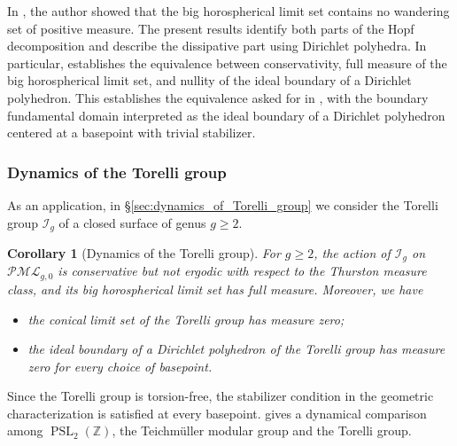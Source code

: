 \documentclass[dvipdfmx]{amsart}
\newtheorem{corollary}{Corollary}[section]
\theoremstyle{remark}
\newcommand{\torelliG}{\mathcal{I}}
\newcommand{\pml}{\mathcal{PML}}
\begin{document}
In \cite[Proposition~8.2]{miyachi2025functiontheorydynamicsergodic},
the author showed that the big horospherical limit set contains
no wandering set of positive measure.
The present results identify both parts of the Hopf decomposition
and describe the dissipative part using Dirichlet polyhedra.
In particular,  establishes the equivalence between conservativity, full measure of
the big horospherical limit set, and nullity of the ideal boundary
of a Dirichlet polyhedron. This establishes the equivalence asked for in \cite[Problem~9]{miyachi2025functiontheorydynamicsergodic},
with the boundary fundamental domain interpreted as the ideal boundary of a Dirichlet polyhedron centered at a basepoint with trivial stabilizer.

\subsubsection{Dynamics of the Torelli group}
As an application, in \S\ref{sec:dynamics_of_Torelli_group} we consider the Torelli group $\torelliG_g$ of a closed surface of genus $g\ge 2$.

\begin{corollary}[Dynamics of the Torelli group]
\label{coro:torelli_main}
For $g\ge 2$, the action of $\torelliG_g$ on $\pml_{g,0}$ is
conservative but not ergodic with respect to the Thurston measure class, and its big horospherical limit set has full measure.
Moreover, we have
\begin{itemize}
\item[(a)] the conical limit set of the Torelli group has measure zero;
\item[(b)] the ideal boundary of a Dirichlet polyhedron of the Torelli group has measure zero for every choice of basepoint.
\end{itemize}
\end{corollary}

Since the Torelli group is torsion-free, the stabilizer condition in the geometric characterization is satisfied at every basepoint.
 gives a dynamical comparison among $\operatorname{PSL}_2(\mathbb{Z})$, the Teichm\"uller modular group and the Torelli group.
\end{document}
